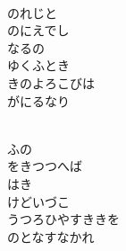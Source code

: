 \documentclass[10pt,b5j]{tarticle} %
\begin{document}
\vspace{1.5em} %
\newcommand{\linespace}{0.5em} %
\newcommand{\blocksize}{0.5\hsize} %
\newcommand{\itemmargin}{3em} %
\begin{enumerate} %
    \setlength{\itemindent}{\itemmargin} %
    \begin{minipage}[c]{\blocksize}
    
        \vspace{\linespace}
        \item~\\
        のれじと\\
        のにえでし\\
        なるの\\
        ゆくふとき\\
        きのよろこびは\\
        がにるなり
        
    \end{minipage}
    \begin{minipage}[c]{\blocksize}
        
        \vspace{\linespace}
        \item~\\
        ふの\\
        をきつつへば\\
        はき\\
        けどいづこ\\
        うつろひやすききを\\
        のとなすなかれ
        
    \end{minipage}
    \begin{minipage}[c]{\blocksize}
        

\end{minipage}
\end{enumerate}
\end{document}

